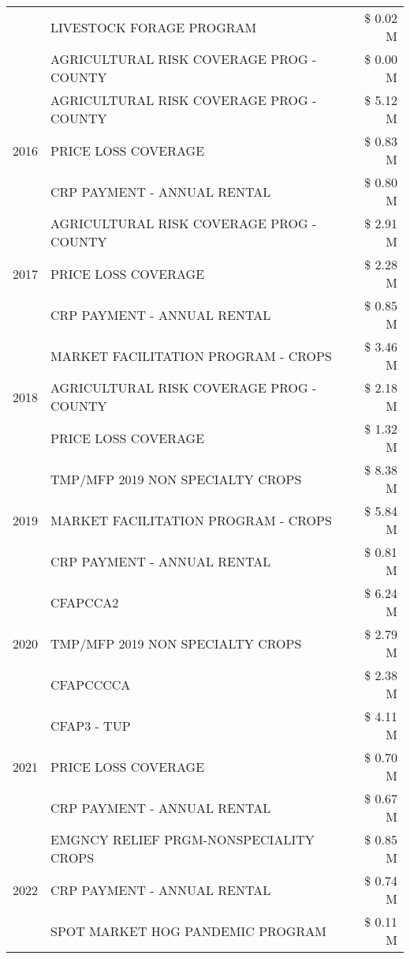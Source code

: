 \begin{tabular}{llr}
 & LIVESTOCK FORAGE PROGRAM & \$ 0.02 M \\
 & AGRICULTURAL RISK COVERAGE PROG - COUNTY & \$ 0.00 M \\
\cline{1-3}
\multirow[t]{3}{*}{2016} & AGRICULTURAL RISK COVERAGE PROG - COUNTY & \$ 5.12 M \\
 & PRICE LOSS COVERAGE & \$ 0.83 M \\
 & CRP PAYMENT - ANNUAL RENTAL & \$ 0.80 M \\
\cline{1-3}
\multirow[t]{3}{*}{2017} & AGRICULTURAL RISK COVERAGE PROG - COUNTY & \$ 2.91 M \\
 & PRICE LOSS COVERAGE & \$ 2.28 M \\
 & CRP PAYMENT - ANNUAL RENTAL & \$ 0.85 M \\
\cline{1-3}
\multirow[t]{3}{*}{2018} & MARKET FACILITATION PROGRAM - CROPS & \$ 3.46 M \\
 & AGRICULTURAL RISK COVERAGE PROG - COUNTY & \$ 2.18 M \\
 & PRICE LOSS COVERAGE & \$ 1.32 M \\
\cline{1-3}
\multirow[t]{3}{*}{2019} & TMP/MFP 2019 NON SPECIALTY CROPS & \$ 8.38 M \\
 & MARKET FACILITATION PROGRAM - CROPS & \$ 5.84 M \\
 & CRP PAYMENT - ANNUAL RENTAL & \$ 0.81 M \\
\cline{1-3}
\multirow[t]{3}{*}{2020} & CFAPCCA2 & \$ 6.24 M \\
 & TMP/MFP 2019 NON SPECIALTY CROPS & \$ 2.79 M \\
 & CFAPCCCCA & \$ 2.38 M \\
\cline{1-3}
\multirow[t]{3}{*}{2021} & CFAP3 - TUP & \$ 4.11 M \\
 & PRICE LOSS COVERAGE & \$ 0.70 M \\
 & CRP PAYMENT - ANNUAL RENTAL & \$ 0.67 M \\
\cline{1-3}
\multirow[t]{3}{*}{2022} & EMGNCY RELIEF PRGM-NONSPECIALITY CROPS & \$ 0.85 M \\
 & CRP PAYMENT - ANNUAL RENTAL & \$ 0.74 M \\
 & SPOT MARKET HOG PANDEMIC PROGRAM & \$ 0.11 M \\
\cline{1-3}
\bottomrule
\end{tabular}
